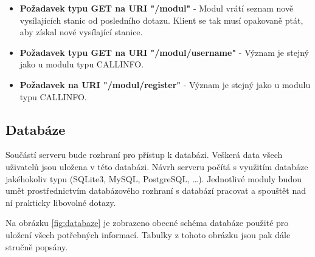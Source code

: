 \begin{itemize}
\item \textbf{Požadavek typu GET na URI "/modul"} - Modul vrátí seznam nově vysílajících stanic od posledního dotazu. Klient se tak
musí opakovaně ptát, aby získal nové vysílající stanice.
\item \textbf{Požadavek typu GET na URI "/modul/username"} - Význam je stejný jako u modulu typu CALLINFO.
\item \textbf{Požadavek na URI "/modul/register"} - Význam je stejný jako u modulu typu CALLINFO.
\end{itemize}

\subsection{Databáze}
\label{navrh_databaze}

Součástí serveru bude rozhraní pro přístup k databázi. Veškerá data všech
uživatelů jsou uložena v této databázi.
Návrh serveru počítá s využitím databáze jakéhokoliv typu (SQLite3, MySQL, PostgreSQL, \dots). Jednotlivé moduly budou
umět prostřednictvím databázového rozhraní s databází pracovat a spouštět nad ní prakticky libovolné dotazy.

Na obrázku \ref{fig:databaze} je zobrazeno obecné schéma databáze použité pro uložení všech potřebných informací. Tabulky
z tohoto obrázku jsou pak dále stručně popsány.

